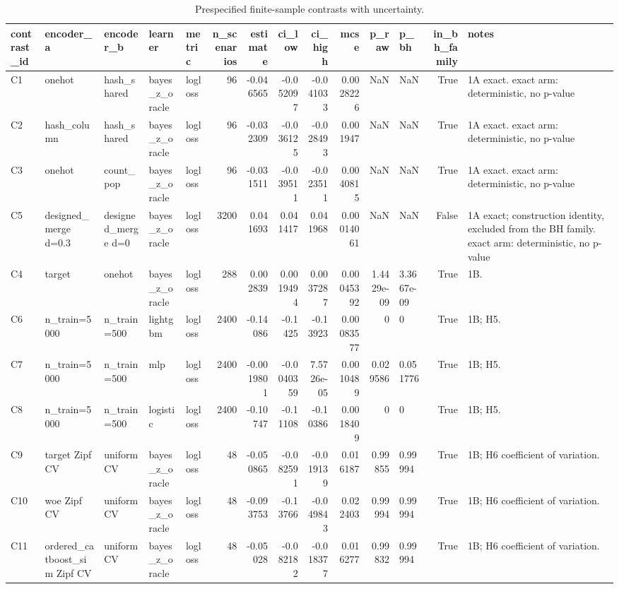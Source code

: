 \begin{table}
\caption{Prespecified finite-sample contrasts with uncertainty.}
\label{tab:tabs3}
\begin{tabular}{lllllrrrrrrlrl}
\toprule
contrast\_id & encoder\_a & encoder\_b & learner & metric & n\_scenarios & estimate & ci\_low & ci\_high & mcse & p\_raw & p\_bh & in\_bh\_family & notes \\
\midrule
C1 & onehot & hash\_shared & bayes\_z\_oracle & logloss & 96 & -0.046565 & -0.052097 & -0.041033 & 0.0028226 & NaN & NaN & True & 1A exact. exact arm: deterministic, no p-value \\
C2 & hash\_column & hash\_shared & bayes\_z\_oracle & logloss & 96 & -0.032309 & -0.036125 & -0.028493 & 0.001947 & NaN & NaN & True & 1A exact. exact arm: deterministic, no p-value \\
C3 & onehot & count\_pop & bayes\_z\_oracle & logloss & 96 & -0.031511 & -0.039511 & -0.023511 & 0.0040815 & NaN & NaN & True & 1A exact. exact arm: deterministic, no p-value \\
C5 & designed\_merge d=0.3 & designed\_merge d=0 & bayes\_z\_oracle & logloss & 3200 & 0.041693 & 0.041417 & 0.041968 & 0.00014061 & NaN & NaN & False & 1A exact; construction identity, excluded from the BH family. exact arm: deterministic, no p-value \\
C4 & target & onehot & bayes\_z\_oracle & logloss & 288 & 0.002839 & 0.0019494 & 0.0037287 & 0.00045392 & 1.4429e-09 & 3.3667e-09 & True & 1B. \\
C6 & n\_train=5000 & n\_train=500 & lightgbm & logloss & 2400 & -0.14086 & -0.1425 & -0.13923 & 0.00083577 & 0 & 0 & True & 1B; H5. \\
C7 & n\_train=5000 & n\_train=500 & mlp & logloss & 2400 & -0.0019801 & -0.0040359 & 7.5726e-05 & 0.0010489 & 0.029586 & 0.051776 & True & 1B; H5. \\
C8 & n\_train=5000 & n\_train=500 & logistic & logloss & 2400 & -0.10747 & -0.11108 & -0.10386 & 0.0018409 & 0 & 0 & True & 1B; H5. \\
C9 & target Zipf CV & uniform CV & bayes\_z\_oracle & logloss & 48 & -0.050865 & -0.082591 & -0.019139 & 0.016187 & 0.99855 & 0.99994 & True & 1B; H6 coefficient of variation. \\
C10 & woe Zipf CV & uniform CV & bayes\_z\_oracle & logloss & 48 & -0.093753 & -0.13766 & -0.049843 & 0.022403 & 0.99994 & 0.99994 & True & 1B; H6 coefficient of variation. \\
C11 & ordered\_catboost\_sim Zipf CV & uniform CV & bayes\_z\_oracle & logloss & 48 & -0.05028 & -0.082182 & -0.018377 & 0.016277 & 0.99832 & 0.99994 & True & 1B; H6 coefficient of variation. \\
\bottomrule
\end{tabular}
\end{table}
